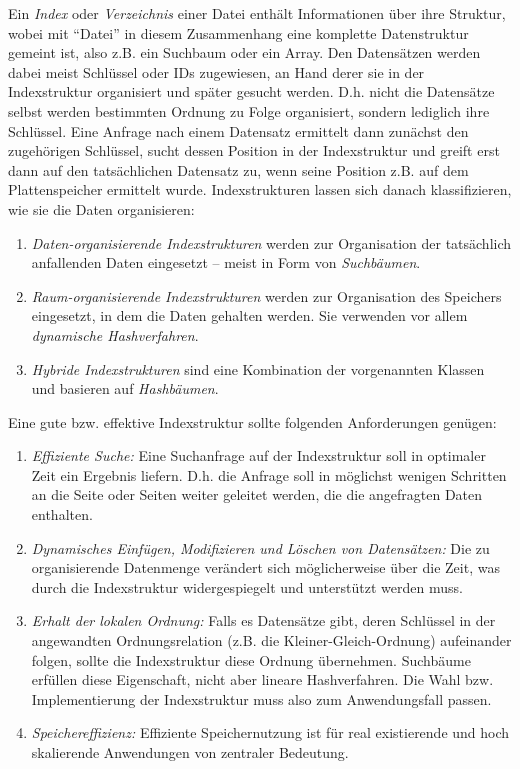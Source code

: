 Ein \textit{Index} oder \textit{Verzeichnis} einer Datei enthält Informationen über ihre Struktur, wobei mit "`Datei"' in diesem Zusammenhang eine komplette Datenstruktur gemeint ist, also z.B. ein Suchbaum oder ein Array. Den Datensätzen werden dabei meist Schlüssel oder IDs zugewiesen, an Hand derer sie in der Indexstruktur organisiert und später gesucht werden. D.h. nicht die Datensätze selbst werden bestimmten Ordnung zu Folge organisiert, sondern lediglich ihre Schlüssel. Eine Anfrage nach einem Datensatz ermittelt dann zunächst den zugehörigen Schlüssel, sucht dessen Position in der Indexstruktur und greift erst dann auf den tatsächlichen Datensatz zu, wenn seine Position z.B. auf dem Plattenspeicher ermittelt wurde. Indexstrukturen lassen sich danach klassifizieren, wie sie die Daten organisieren: 
\begin{enumerate}
\setlength{\itemsep}{20pt}
	\item \textit{Daten-organisierende Indexstrukturen} werden zur Organisation der tatsächlich anfallenden Daten eingesetzt -- meist in Form von \textit{Suchbäumen}. 
	\item \textit{Raum-organisierende Indexstrukturen} werden zur Organisation des Speichers eingesetzt, in dem die Daten gehalten werden. Sie verwenden vor allem \textit{dynamische Hashverfahren}. 
	\item \textit{Hybride Indexstrukturen} sind eine Kombination der vorgenannten Klassen und basieren auf \textit{Hashbäumen}.   
\end{enumerate}
\newpage
\noindent
Eine gute bzw. effektive Indexstruktur sollte folgenden Anforderungen genügen: 
\begin{enumerate}
\setlength{\itemsep}{20pt}
	\item \textit{Effiziente Suche:} Eine Suchanfrage auf der Indexstruktur soll in optimaler Zeit ein Ergebnis liefern. D.h. die Anfrage soll in möglichst wenigen Schritten an die Seite oder Seiten weiter geleitet werden, die die angefragten Daten enthalten.
	\item \textit{Dynamisches Einfügen, Modifizieren und Löschen von Datensätzen:} Die zu organisierende Datenmenge verändert sich möglicherweise über die Zeit, was durch die Indexstruktur widergespiegelt und unterstützt werden muss.  
	\item \textit{Erhalt der lokalen Ordnung:} Falls es Datensätze gibt, deren Schlüssel in der angewandten Ordnungsrelation (z.B. die Kleiner-Gleich-Ordnung) aufeinander folgen, sollte die Indexstruktur diese Ordnung übernehmen. Suchbäume erfüllen diese Eigenschaft, nicht aber lineare Hashverfahren. Die Wahl bzw. Implementierung der Indexstruktur muss also zum Anwendungsfall passen. 
	\item \textit{Speichereffizienz:} Effiziente Speichernutzung ist für real existierende und hoch skalierende Anwendungen von zentraler Bedeutung. 
\end{enumerate}

